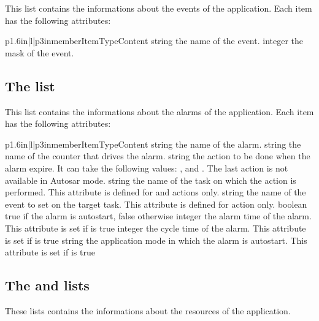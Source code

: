 This list contains the informations about the events of the application. Each item has the following attributes:

\begin{longtableiii}{p{1.6in}|l|p{3in}}{member}{Item}{Type}{Content}
  {string}
  {the name of the event.}
  {integer}
  {the mask of the event.}
\end{longtableiii}

\subsection{The  list}

This list contains the informations about the alarms of the application. Each item has the following attributes:

\begin{longtableiii}{p{1.6in}|l|p{3in}}{member}{Item}{Type}{Content}
  {string}
  {the name of the alarm.}
  {string}
  {the name of the counter that drives the alarm.}
  {string}
  {the action to be done when the alarm expire. It can take the following values: ,  and . The last action is not available in Autosar mode.}
  {string}
  {the name of the task on which the action is performed. This attribute is defined for  and  actions only.}
  {string}
  {the name of the event to set on the target task. This attribute is defined for  action only.}
  {boolean}
  {true if the alarm is autostart, false otherwise}
  {integer}
  {the alarm time of the alarm. This attribute is set if  is true}
  {integer}
  {the cycle time of the alarm. This attribute is set if  is true}
  {string}
  {the application mode in which the alarm is autostart. This attribute is set if  is true}
\end{longtableiii}

\subsection{The  and  lists}

These lists contains the informations about the resources of the application.

